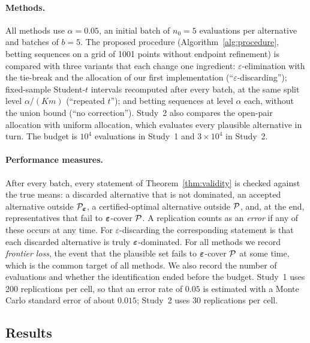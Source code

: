\paragraph{Methods.} All methods use $\alpha=0.05$, an initial batch of $n_0=5$ evaluations per alternative and batches of $b=5$. The proposed procedure (Algorithm~\ref{alg:procedure}, betting sequences on a grid of 1001 points without endpoint refinement) is compared with three variants that each change one ingredient: $\varepsilon$-elimination with the tie-break and the allocation of our first implementation (``$\varepsilon$-discarding''); fixed-sample Student-$t$ intervals recomputed after every batch, at the same split level $\alpha/(Km)$ (``repeated $t$''); and betting sequences at level $\alpha$ each, without the union bound (``no correction''). Study~2 also compares the open-pair allocation with uniform allocation, which evaluates every plausible alternative in turn. The budget is $10^4$ evaluations in Study~1 and $3\times10^4$ in Study~2.

\paragraph{Performance measures.} After every batch, every statement of Theorem~\ref{thm:validity} is checked against the true means: a discarded alternative that is not dominated, an accepted alternative outside $\mathcal{P}_{\bm{\varepsilon}}$, a certified-optimal alternative outside $\mathcal{P}$, and, at the end, representatives that fail to $\bm{\varepsilon}$-cover $\mathcal{P}$. A replication counts as an \emph{error} if any of these occurs at any time. For $\varepsilon$-discarding the corresponding statement is that each discarded alternative is truly $\bm{\varepsilon}$-dominated. For all methods we record \emph{frontier loss}, the event that the plausible set fails to $\bm{\varepsilon}$-cover $\mathcal{P}$ at some time, which is the common target of all methods. We also record the number of evaluations and whether the identification ended before the budget. Study~1 uses 200 replications per cell, so that an error rate of $0.05$ is estimated with a Monte Carlo standard error of about $0.015$; Study~2 uses 30 replications per cell.

\subsection{Results}\label{sec:sim-results}

